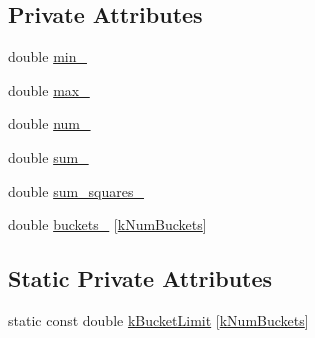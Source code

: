 \subsection*{Private Attributes}
\begin{DoxyCompactItemize}
\item 
double \hyperlink{classleveldb_1_1_histogram_aa074ae70ad7abbdaf12b97282eb1b700}{min\-\_\-}
\item 
double \hyperlink{classleveldb_1_1_histogram_afd840834f24cdc85ee08fc6158495327}{max\-\_\-}
\item 
double \hyperlink{classleveldb_1_1_histogram_a3ec0c6cddbe0b040ee05d938f716e9b2}{num\-\_\-}
\item 
double \hyperlink{classleveldb_1_1_histogram_a5a2588e02237189eca8a1b2e8601e961}{sum\-\_\-}
\item 
double \hyperlink{classleveldb_1_1_histogram_a10c67c4ce34a29c17d000927f730632e}{sum\-\_\-squares\-\_\-}
\item 
double \hyperlink{classleveldb_1_1_histogram_a332d20f5b4811483f443a0fffde60a27}{buckets\-\_\-} \mbox{[}\hyperlink{classleveldb_1_1_histogram_ab80178436a059da1cf5f6e9a5f76a747a6ea13d53f7e3910a6b7c293d48d0a0da}{k\-Num\-Buckets}\mbox{]}
\end{DoxyCompactItemize}
\subsection*{Static Private Attributes}
\begin{DoxyCompactItemize}
\item 
static const double \hyperlink{classleveldb_1_1_histogram_aaad18e83be993ecfe63a566869a9d3cc}{k\-Bucket\-Limit} \mbox{[}\hyperlink{classleveldb_1_1_histogram_ab80178436a059da1cf5f6e9a5f76a747a6ea13d53f7e3910a6b7c293d48d0a0da}{k\-Num\-Buckets}\mbox{]}
\end{DoxyCompactItemize}


